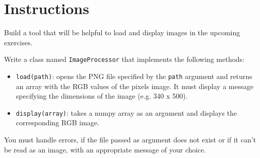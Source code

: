 \documentclass{42-en}
\begin{document}
\section*{Instructions}
Build a tool that will be helpful to load and display images in the upcoming exercises.

Write a class named \texttt{ImageProcessor} that implements the following methods:
\begin{itemize}
  \item \texttt{load(path)}: opens the PNG file specified by the \texttt{path} argument and returns an array with the RGB values of the pixels image. It must display a message specifying the dimensions of the image (e.g. 340 x 500).

  \item \texttt{display(array)}: takes a numpy array as an argument and displays the corresponding RGB image.
\end{itemize}

You must handle errors, if the file passed as argument does not exist or if it can't be read as an image, with an appropriate message of your choice.


\end{document}

